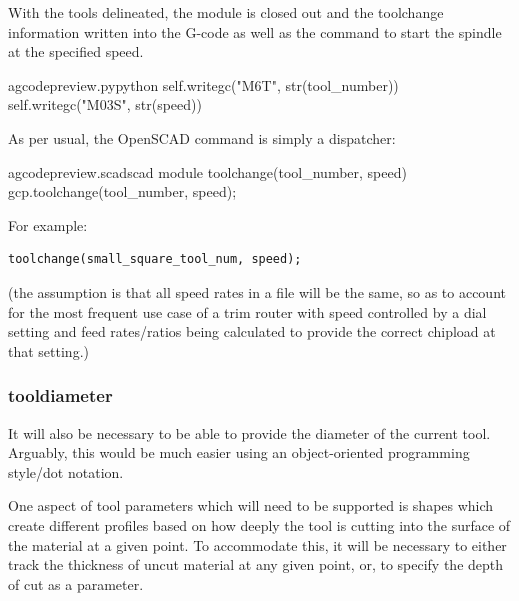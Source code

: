 \documentclass{ltxdoc}
\begin{document}
\noindent With the tools delineated, the module is closed out and the toolchange information written into the G-code as well as the command to start the spindle at the specified speed.
 
\lstset{firstnumber=\thegcpy}
\begin{writecode}{a}{gcodepreview.py}{python}
        self.writegc("M6T", str(tool_number))
        self.writegc("M03S", str(speed))

\end{writecode}
\addtocounter{gcpy}{3}


As per usual, the OpenSCAD command is simply a dispatcher:

\lstset{firstnumber=\thegcpscad}
\begin{writecode}{a}{gcodepreview.scad}{scad}
module toolchange(tool_number, speed){
    gcp.toolchange(tool_number, speed);
}

\end{writecode}
\addtocounter{gcpscad}{4}

\noindent For example:

\begin{verbatim}
toolchange(small_square_tool_num, speed);
\end{verbatim}

\noindent (the assumption is that all speed rates in a file will be the same, so as to account for the most frequent use case of a trim router with speed controlled by a dial setting and feed rates/ratios being calculated to provide the correct chipload at that setting.)

\subsubsection{tooldiameter}

It will also be necessary to be able to provide the diameter of the current tool. Arguably, this would be much easier using an object-oriented programming style/dot notation.

One aspect of tool parameters which will need to be supported is shapes which create different profiles based on how deeply the tool is cutting into the surface of the material at a given point. To accommodate this, it will be necessary to either track the thickness of uncut material at any given point, or, to specify the depth of cut as a parameter.
\end{document}
